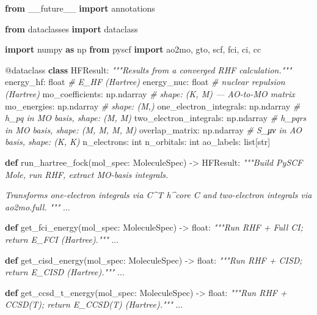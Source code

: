 \documentclass[
  11pt,
]{report}
\newenvironment{Shaded}{}{}
\newcommand{\AttributeTok}[1]{\textcolor[rgb]{0.49,0.56,0.16}{#1}}
\newcommand{\BuiltInTok}[1]{\textcolor[rgb]{0.00,0.50,0.00}{#1}}
\newcommand{\CommentTok}[1]{\textcolor[rgb]{0.38,0.63,0.69}{\textit{#1}}}
\newcommand{\ImportTok}[1]{\textcolor[rgb]{0.00,0.50,0.00}{\textbf{#1}}}
\newcommand{\KeywordTok}[1]{\textcolor[rgb]{0.00,0.44,0.13}{\textbf{#1}}}
\newcommand{\NormalTok}[1]{#1}
\newcommand{\OperatorTok}[1]{\textcolor[rgb]{0.40,0.40,0.40}{#1}}
\begin{document}
\begin{Shaded}
\begin{Highlighting}[]
\ImportTok{from}\NormalTok{ \_\_future\_\_ }\ImportTok{import}\NormalTok{ annotations}

\ImportTok{from}\NormalTok{ dataclasses }\ImportTok{import}\NormalTok{ dataclass}

\ImportTok{import}\NormalTok{ numpy }\ImportTok{as}\NormalTok{ np}
\ImportTok{from}\NormalTok{ pyscf }\ImportTok{import}\NormalTok{ ao2mo, gto, scf, fci, ci, cc}


\AttributeTok{@dataclass}
\KeywordTok{class}\NormalTok{ HFResult:}
    \CommentTok{"""Results from a converged RHF calculation."""}
\NormalTok{    energy\_hf: }\BuiltInTok{float}                        \CommentTok{\# E\_HF (Hartree)}
\NormalTok{    energy\_nuc: }\BuiltInTok{float}                       \CommentTok{\# nuclear repulsion (Hartree)}
\NormalTok{    mo\_coefficients: np.ndarray             }\CommentTok{\# shape: (K, M) — AO{-}to{-}MO matrix}
\NormalTok{    mo\_energies: np.ndarray                 }\CommentTok{\# shape: (M,)}
\NormalTok{    one\_electron\_integrals: np.ndarray      }\CommentTok{\# h\_pq in MO basis, shape: (M, M)}
\NormalTok{    two\_electron\_integrals: np.ndarray      }\CommentTok{\# h\_pqrs in MO basis, shape: (M, M, M, M)}
\NormalTok{    overlap\_matrix: np.ndarray              }\CommentTok{\# S\_μν in AO basis, shape: (K, K)}
\NormalTok{    n\_electrons: }\BuiltInTok{int}
\NormalTok{    n\_orbitals: }\BuiltInTok{int}
\NormalTok{    ao\_labels: }\BuiltInTok{list}\NormalTok{[}\BuiltInTok{str}\NormalTok{]}


\KeywordTok{def}\NormalTok{ run\_hartree\_fock(mol\_spec: MoleculeSpec) }\OperatorTok{{-}\textgreater{}}\NormalTok{ HFResult:}
    \CommentTok{"""Build PySCF Mole, run RHF, extract MO{-}basis integrals.}

\CommentTok{    Transforms one{-}electron integrals via C\^{}T h\^{}core C and}
\CommentTok{    two{-}electron integrals via ao2mo.full.}
\CommentTok{    """}
\NormalTok{    ...}


\KeywordTok{def}\NormalTok{ get\_fci\_energy(mol\_spec: MoleculeSpec) }\OperatorTok{{-}\textgreater{}} \BuiltInTok{float}\NormalTok{:}
    \CommentTok{"""Run RHF + Full CI; return E\_FCI (Hartree)."""}
\NormalTok{    ...}


\KeywordTok{def}\NormalTok{ get\_cisd\_energy(mol\_spec: MoleculeSpec) }\OperatorTok{{-}\textgreater{}} \BuiltInTok{float}\NormalTok{:}
    \CommentTok{"""Run RHF + CISD; return E\_CISD (Hartree)."""}
\NormalTok{    ...}


\KeywordTok{def}\NormalTok{ get\_ccsd\_t\_energy(mol\_spec: MoleculeSpec) }\OperatorTok{{-}\textgreater{}} \BuiltInTok{float}\NormalTok{:}
    \CommentTok{"""Run RHF + CCSD(T); return E\_CCSD(T) (Hartree)."""}
\NormalTok{    ...}
\end{Highlighting}
\end{Shaded}
\end{document}
